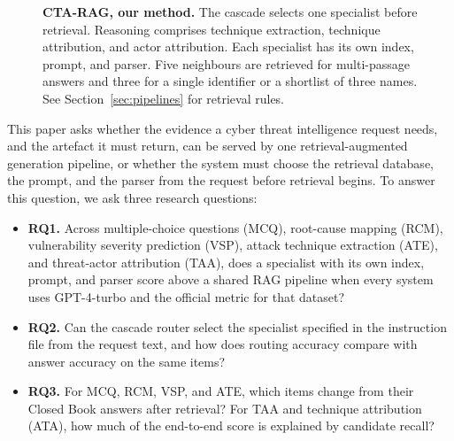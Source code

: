 \documentclass[5p,times,authoryear]{elsarticle}
\begin{document}
\begin{figure}[t]
{%
}

\caption{\textbf{CTA-RAG, our method.}
The cascade selects one specialist before retrieval.
Reasoning comprises technique extraction, technique attribution, and actor attribution.
Each specialist has its own index, prompt, and parser.
Five neighbours are retrieved for multi-passage answers and three for a single identifier or a shortlist of three names.
See Section~\ref{sec:pipelines} for retrieval rules.}
\label{fig:arch}

\end{figure}

This paper asks whether the evidence a cyber threat intelligence request needs, and the artefact it must return, can be served by one retrieval-augmented generation pipeline, or whether the system must choose the retrieval database, the prompt, and the parser from the request before retrieval begins. To answer this question, we ask three research questions: 
\begin{itemize}
\item \noindent\textbf{RQ1.} Across multiple-choice questions (MCQ), root-cause mapping (RCM), vulnerability severity prediction (VSP), attack technique extraction (ATE), and threat-actor attribution (TAA), does a specialist with its own index, prompt, and parser score above a shared RAG pipeline when every system uses GPT-4-turbo and the official metric for that dataset?

\item \noindent\textbf{RQ2.} Can the cascade router select the specialist specified in the instruction file from the request text, and how does routing accuracy compare with answer accuracy on the same items?

\item \noindent\textbf{RQ3.} For MCQ, RCM, VSP, and ATE, which items change from their Closed Book answers after retrieval? For TAA and technique attribution (ATA), how much of the end-to-end score is explained by candidate recall?
\end{itemize}
\end{document}
